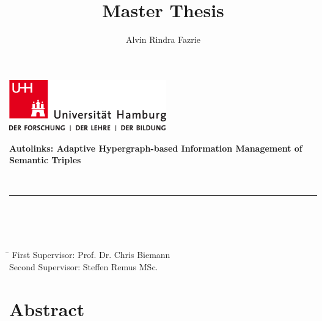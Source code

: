 \documentclass[
    fontsize=12pt,
    headings=small,
    parskip=half,           %
    bibliography=totoc,
    numbers=noenddot,       %
    open=any,               %
    ]{scrreprt}
\title{Master Thesis}
\author{Alvin Rindra Fazrie}
\begin{document}
\begin{titlepage}
\includegraphics[width=6.8cm]{../pic/up-uhh-logo-u-2010-u-farbe-u-rgb.pdf}
  \setcounter{page}{-1}


	\vfill
\begin{center} 
		\vspace{14mm}
		\noindent \textbf{\huge
		  Autolinks: Adaptive Hypergraph-based Information Management of Semantic Triples 
		}
		\vspace{60mm}	
	\end{center}
	
	\vfill
	
	 \\
	\noindent \rule{\textwidth}{0.4mm} 
	 \\
	 \\
	 \\
	\begin{tabbing}
	\hspace{8em} \=  \kill
	First Supervisor: \> Prof. Dr. Chris Biemann \\
	Second Supervisor: \> Steffen Remus MSc. \\
	\end{tabbing}
\end{titlepage}


\chapter*{Abstract}
\end{document}
